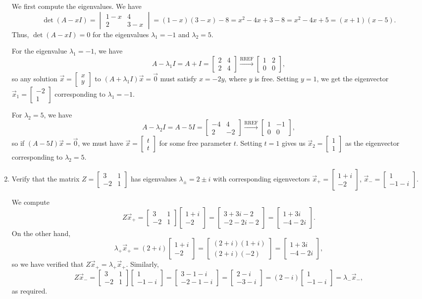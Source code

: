 \documentclass[12pt]{article}
\newcommand{\bbm}{\begin{bmatrix}}
\newcommand{\ebm}{\end{bmatrix}}
\begin{document}
\begin{enumerate}
\bigskip

We first compute the eigenvalues. We have
\[
 \det(A-xI) = \begin{vmatrix}1-x&4\\2&3-x\end{vmatrix} = (1-x)(3-x)-8 = x^2-4x+3-8 = x^2-4x+5 = (x+1)(x-5).
\]
Thus, $\det(A-xI)=0$ for the eigenvalues $\lambda_1 = -1$ and $\lambda_2=5$.

For the eigenvalue $\lambda_1=-1$, we have
\[
 A-\lambda_1I = A+I = \bbm 2&4\\2&4\ebm \xrightarrow{\text{RREF}} \bbm 1&2\\0&0\ebm,
\]
so any solution $\vec{x} = \bbm x\\y\ebm$ to $(A+\lambda_1I)\vec{x}=\vec{0}$ must satisfy $x=-2y$, where $y$ is free. Setting $y=1$, we get the eigenvector $\vec{x}_1 = \bbm -2\\1\ebm$ corresponding to $\lambda_1=-1$.

For $\lambda_2=5$, we have
\[
 A-\lambda_2I = A-5I = \bbm -4&4\\2&-2\ebm\xrightarrow{\text{RREF}} \bbm 1&-1\\0&0\ebm,
\]
so if $(A-5I)\vec{x}=\vec{0}$, we must have $\vec{x} = \bbm t\\t\ebm$ for some free parameter $t$. Setting $t=1$ gives us $\vec{x}_2 = \bbm 1\\1\ebm$ as the eigenvector corresponding to $\lambda_2=5$.

\newpage


\item Verify that the matrix $Z = \bbm 3&1\\-2&1\ebm$ has eigenvalues $\lambda_\pm = 2\pm i$ with corresponding eigenvectors $\vec{x}_+ = \bbm 1+i\\-2\ebm$, $\vec{x}_- = \bbm 1\\-1-i\ebm$.

\bigskip

We compute 
\[
Z\vec{x}_+ = \bbm 3&1\\-2&1\ebm\bbm 1+i\\-2\ebm = \bbm 3+3i-2\\-2-2i-2\ebm = \bbm 1+3i\\-4-2i\ebm. 
\]
On the other hand,
\[
 \lambda_+\vec{x}_+ = (2+i)\bbm 1+i\\-2\ebm = \bbm (2+i)(1+i)\\(2+i)(-2)\ebm = \bbm 1+3i\\-4-2i\ebm,
\]
so we have verified that $Z\vec{x}_+ = \lambda_+\vec{x}_+$. Similarly,
\[
 Z\vec{x}_- = \bbm 3&1\\-2&1\ebm\bbm 1\\-1-i\ebm = \bbm 3-1-i\\-2-1-i\ebm = \bbm 2-i\\-3-i\ebm = (2-i)\bbm 1\\-1-i\ebm = \lambda_-\vec{x}_-,
\]
as required.
 \end{enumerate}
\end{document}
